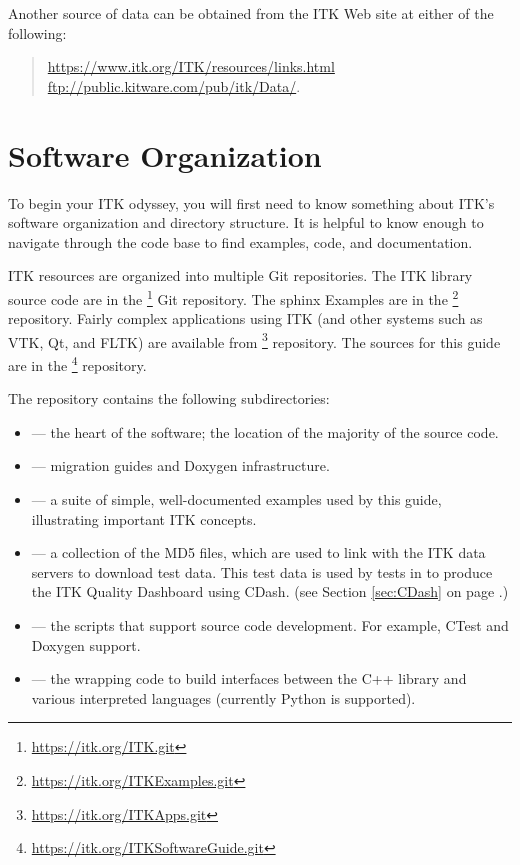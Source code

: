 Another source of data can be obtained from the ITK Web site at either
of the following:
\begin{quote}
\url{https://www.itk.org/ITK/resources/links.html} \\
\url{ftp://public.kitware.com/pub/itk/Data/}.
\end{quote}

\section{Software Organization}
\label{sec:SoftwareOrganization}

To begin your ITK odyssey, you will first need to know something about
ITK's software organization and directory structure. It is helpful to
know enough to navigate through the code base to find examples, code,
and documentation.

ITK resources are organized into multiple Git repositories. The ITK library source
code are in the \footnote{\url{https://itk.org/ITK.git}} Git
repository. The sphinx Examples are in the
\footnote{\url{https://itk.org/ITKExamples.git}} repository.
Fairly complex applications using ITK (and other systems such as VTK, Qt, and
FLTK) are available from
\footnote{\url{https://itk.org/ITKApps.git}}
repository.  The sources for this guide are in the
\footnote{\url{https://itk.org/ITKSoftwareGuide.git}}
repository.

The  repository contains the following subdirectories:
\begin{itemize}
        \item {} --- the heart of the software; the location
        of the majority of the source code.
        \item {} --- migration guides and Doxygen infrastructure.
        \item {} --- a suite of simple, well-documented
        examples used by this guide, illustrating important
        ITK concepts.
        \item {} --- a collection of the MD5 files, which are
used to link with the ITK data servers to download test data. This test data is
used by tests in  to produce the ITK Quality Dashboard using
CDash.
        (see Section \ref{sec:CDash} on page \pageref{sec:CDash}.)
        \item {} --- the scripts that support source code development. For example, CTest and Doxygen support.
        \item {} --- the wrapping code to build interfaces between the C++ library and various interpreted languages (currently Python is supported).
\end{itemize}

